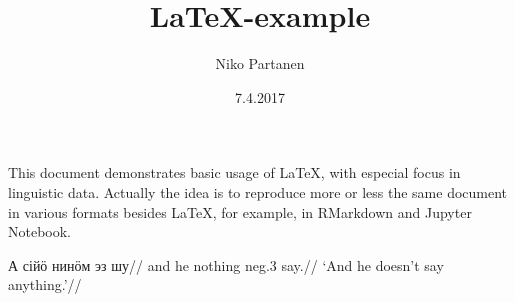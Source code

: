 \documentclass[a4paper, 12pt, english]{article}
\title{\LaTeX-example}
\author{Niko Partanen}
\date{7.4.2017}
\begin{document}
\maketitle 
This document demonstrates basic usage of \LaTeX, with especial focus in linguistic data. Actually the idea is to reproduce more or less the same document in various formats besides LaTeX, for example, in RMarkdown and Jupyter Notebook.


\ex
\begingl
\gla А сійӧ нинӧм эз шу//
\glb and he nothing neg.3 say.//
\glft ‘And he doesn't say anything.’//
\endgl
\xe 
   
 
\end{document}
